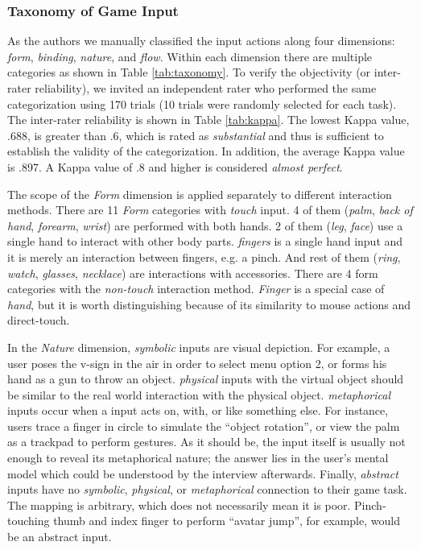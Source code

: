 \documentclass{sigchi}
\begin{document}
  \subsubsection{Taxonomy of Game Input}
       
  As the authors we manually classified the input actions along four dimensions: \emph{form}, \emph{binding}, \emph{nature}, and \emph{flow}. Within each dimension there are multiple categories as shown in Table \ref{tab:taxonomy}. To verify the objectivity (or inter-rater reliability), we invited an independent rater who performed the same categorization using 170 trials (10 trials were randomly selected for each task). The inter-rater reliability is shown in Table \ref{tab:kappa}. The lowest Kappa value, .688, is greater than .6, which is rated as \textsl{substantial} and thus is sufficient to establish the validity of the categorization. In addition, the average Kappa value is .897. A Kappa value of .8 and higher is considered \textsl{almost perfect}\cite{kappavalue}.



  

  The scope of the \emph{Form} dimension is applied separately to different interaction methods. There are 11 \emph{Form} categories with \emph{touch} input. 4 of them (\emph{palm}, \emph{back of hand}, \emph{forearm}, \emph{wrist}) are performed with both hands. 2 of them (\emph{leg}, \emph{face}) use a single hand to interact with other body parts. \emph{fingers} is a single hand input and it is merely an interaction between fingers, e.g. a pinch. And rest of them (\emph{ring}, \emph{watch}, \emph{glasses}, \emph{necklace}) are interactions with accessories. There are 4 form categories with the \emph{non-touch} interaction method. \emph{Finger} is a special case of \emph{hand}, but it is worth distinguishing because of its similarity to mouse actions and direct-touch.


  In the \emph{Nature} dimension, \emph{symbolic} inputs are visual depiction. For example, a user poses the v-sign in the air in order to select menu option 2, or forms his hand as a gun to throw an object. \emph{physical} inputs with the virtual object should be similar to the real world interaction with the physical object. \emph{metaphorical} inputs occur when a input acts on, with, or like something else. For instance, users trace a finger in circle to simulate the ``object rotation'', or view the palm as a trackpad to perform gestures. As it should be, the input itself is usually not enough to reveal its metaphorical nature; the answer lies in the user's mental model which could be understood by the interview afterwards. Finally, \emph{abstract} inputs have no \emph{symbolic}, \emph{physical}, or \emph{metaphorical} connection to their game task. The mapping is arbitrary, which does not necessarily mean it is poor. Pinch-touching thumb and index finger to perform ``avatar jump'', for example, would be an abstract input.
\end{document}
